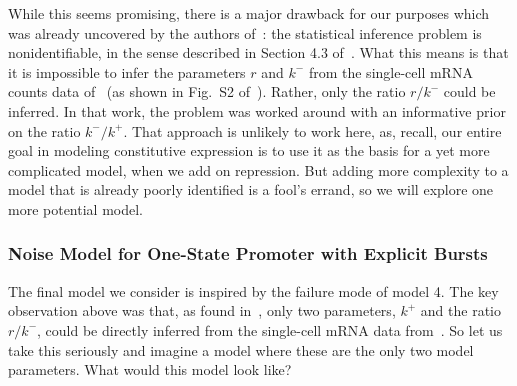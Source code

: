 While this seems promising, there is a major drawback for our purposes which was
already uncovered by the authors of~\cite{Razo-Mejia2020}: the statistical
inference problem is nonidentifiable, in the sense described in Section 4.3
of~\cite{Gelman2013}. What this means is that it is impossible to infer the
parameters $r$ and $k^-$ from the single-cell mRNA counts data
of~\cite{Jones2014} (as shown in Fig.~S2 of~\cite{Razo-Mejia2020}). Rather, only
the ratio $r/k^-$ could be inferred. In that work, the problem was worked around
with an informative prior on the ratio $k^-/k^+$. That approach is unlikely to
work here, as, recall, our entire goal in modeling constitutive expression is to
use it as the basis for a yet more complicated model, when we add on repression.
But adding more complexity to a model that is already poorly identified is a
fool's errand, so we will explore one more potential model.


\subsubsection{Noise Model for One-State Promoter with Explicit Bursts}

The final model we consider is 
inspired by the failure mode of model 4. The key observation above
was that, as found in~\cite{Razo-Mejia2020}, only two parameters, $k^+$ and the
ratio $r/k^-$, could be directly inferred from the single-cell mRNA data
from~\cite{Jones2014}. So let us take this seriously and imagine a model where
these are the only two model parameters. What would this model look like?

